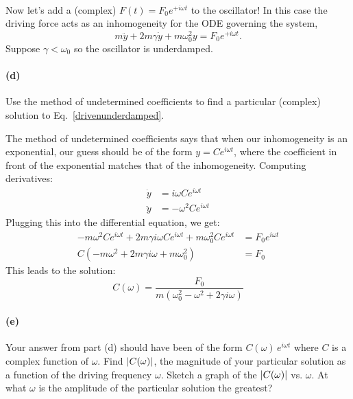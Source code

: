 \documentclass{article}
\begin{document}
\phline
\paragraph{}
Now let's add a (complex)  $F(t) = F_{0}e^{+i\omega t}$ to the oscillator! 
In this case the driving force acts as an inhomogeneity for the ODE governing the system, 
	\begin{equation}
		m\ddot{y} + 2m\gamma\dot{y} + m\omega_{0}^{2}y = F_{0}e^{+i\omega t}.
	\label{drivenunderdamped}
	\end{equation}
Suppose $\gamma<\omega_{0}$ so the oscillator is underdamped.

\paragraph{(d)}
Use the method of undetermined coefficients to find a particular (complex) solution to Eq.~\ref{drivenunderdamped}.  

\begin{solution}
	The method of undetermined coefficients says that when our inhomogeneity is an exponential, our guess should 
	be of the form $y = Ce^{i \omega t}$, where the coefficient in front of the exponential matches that of 
	the inhomogeneity. Computing derivatives:
	\begin{align*}
		\dot y &= i \omega Ce^{i \omega t}\\
		\ddot y &= - \omega^2 Ce^{i \omega t} 
	\end{align*}
	Plugging this into the differential equation, we get:
	\begin{align*}
		-m \omega^2 Ce^{i \omega t} + 2m \gamma i \omega C e^{i \omega t} + m \omega_0^2 C e^{i \omega t} &= 
		F_0 e^{i \omega t}\\
		C(-m \omega^2 + 2m \gamma i \omega + m \omega_0^2) &=  F_0
	\end{align*}
	This leads to the solution:
	\[
	C(\omega) = \frac{F_0}{m(\omega_0^2 - \omega^2 + 2 \gamma i \omega) }
	\] 
\end{solution}

\paragraph{(e)}
Your answer from part (d) should have been of the form $C(\omega)\,e^{i\omega t}$ where $C$ is a complex function of $\omega$.  
Find $\left|{C(\omega)}\right|$, the magnitude of your particular solution as a function of the
driving frequency $\omega$.  Sketch a graph of the $\left|{C(\omega)}\right|$ vs. $\omega$.  At what $\omega$ is the amplitude of the particular solution the greatest?
\end{document}
